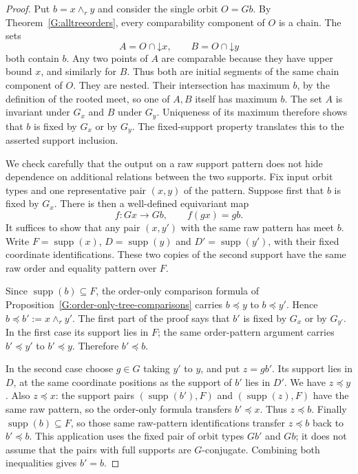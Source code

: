\begin{proof}
Put $b=x\wedge_r y$ and consider the single orbit $O=Gb$.
By Theorem~\ref{G:alltreeorders}, every comparability component
of $O$ is a chain. The sets
\[
 A=O\cap\mathord\downarrow x,\qquad
 B=O\cap\mathord\downarrow y
\]
both contain $b$. Any two points of $A$ are comparable because
they have upper bound $x$, and similarly for $B$. Thus both
are initial segments of the same chain component of $O$.
They are nested. Their intersection has maximum $b$, by
the definition of the rooted meet, so one of $A,B$ itself
has maximum $b$. The set $A$ is invariant under $G_x$ and
$B$ under $G_y$. Uniqueness of its maximum therefore shows
that $b$ is fixed by $G_x$ or by $G_y$. The fixed-support
property translates this to the asserted support inclusion.

We check carefully that the output on a raw support pattern
does not hide dependence on additional relations between the
two supports. Fix input orbit types and one representative
pair $(x,y)$ of the pattern. Suppose first that $b$ is fixed
by $G_x$. There is then a well-defined equivariant map
\[
 f:Gx\longrightarrow Gb,\qquad f(gx)=gb.
\]
It suffices to show that any pair $(x,y')$ with the same raw
pattern has meet $b$. Write $F=\operatorname{supp}(x)$,
$D=\operatorname{supp}(y)$ and
$D'=\operatorname{supp}(y')$, with their fixed coordinate
identifications. These two copies of the second support have
the same raw order and equality pattern over $F$.

Since $\operatorname{supp}(b)\subseteq F$, the order-only
comparison formula of
Proposition~\ref{G:order-only-tree-comparisons} carries
$b\preceq y$ to $b\preceq y'$. Hence
$b\preceq b':=x\wedge_r y'$. The first part of the proof
says that $b'$ is fixed by $G_x$ or by $G_{y'}$.
In the first case its support lies in $F$; the same
order-pattern argument carries $b'\preceq y'$ to
$b'\preceq y$. Therefore $b'\preceq b$.

In the second case choose $g\in G$ taking $y'$ to $y$, and
put $z=gb'$. Its support lies in $D$, at the same coordinate
positions as the support of $b'$ lies in $D'$. We have
$z\preceq y$. Also $z\preceq x$: the support pairs
$(\operatorname{supp}(b'),F)$ and
$(\operatorname{supp}(z),F)$ have the same raw pattern,
so the order-only formula transfers $b'\preceq x$.
Thus $z\preceq b$. Finally $\operatorname{supp}(b)\subseteq F$,
so those same raw-pattern identifications transfer
$z\preceq b$ back to $b'\preceq b$. This application uses
the fixed pair of orbit types $Gb'$ and $Gb$; it does not
assume that the pairs with full supports are $G$-conjugate.
Combining both inequalities gives $b'=b$.


\end{proof}
